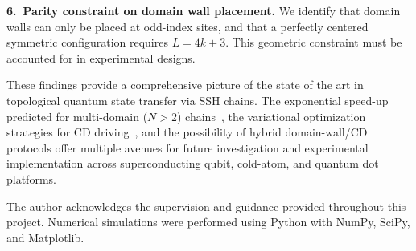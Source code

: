 \documentclass[
  reprint,
  amsmath,
  amssymb,
  aps,
  prb,
  longbibliography,
]{revtex4-2}
\begin{document}
\textbf{6.~Parity constraint on domain wall placement.}
We identify that domain walls can only be placed at odd-index sites, and that
a perfectly centered symmetric configuration requires $L = 4k + 3$. This
geometric constraint must be accounted for in experimental designs.

These findings provide a comprehensive picture of the state of the art in
topological quantum state transfer via SSH chains. The exponential speed-up
predicted for multi-domain ($N > 2$) chains~\cite{Zurita2023}, the variational
optimization strategies for CD driving~\cite{Romero2024, Hegade2021}, and the
possibility of hybrid domain-wall/CD protocols offer multiple avenues for future
investigation and experimental implementation across superconducting qubit,
cold-atom, and quantum dot platforms.

\begin{acknowledgments}
The author acknowledges the supervision and guidance provided throughout this
project. Numerical simulations were performed using Python with NumPy,
SciPy, and Matplotlib.
\end{acknowledgments}


\end{document}
